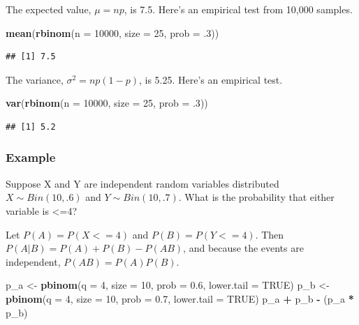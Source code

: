 \documentclass[
]{book}
\newenvironment{Shaded}{\begin{snugshade}}{\end{snugshade}}
\newcommand{\DataTypeTok}[1]{\textcolor[rgb]{0.13,0.29,0.53}{#1}}
\newcommand{\DecValTok}[1]{\textcolor[rgb]{0.00,0.00,0.81}{#1}}
\newcommand{\FloatTok}[1]{\textcolor[rgb]{0.00,0.00,0.81}{#1}}
\newcommand{\KeywordTok}[1]{\textcolor[rgb]{0.13,0.29,0.53}{\textbf{#1}}}
\newcommand{\NormalTok}[1]{#1}
\newcommand{\OperatorTok}[1]{\textcolor[rgb]{0.81,0.36,0.00}{\textbf{#1}}}
\newcommand{\OtherTok}[1]{\textcolor[rgb]{0.56,0.35,0.01}{#1}}
\newcommand{\StringTok}[1]{\textcolor[rgb]{0.31,0.60,0.02}{#1}}
\begin{document}
The expected value, \(\mu = np\), is 7.5. Here's an empirical test from 10,000 samples.

\begin{Shaded}
\begin{Highlighting}[]
\KeywordTok{mean}\NormalTok{(}\KeywordTok{rbinom}\NormalTok{(}\DataTypeTok{n =} \DecValTok{10000}\NormalTok{, }\DataTypeTok{size =} \DecValTok{25}\NormalTok{, }\DataTypeTok{prob =} \FloatTok{.3}\NormalTok{))}
\end{Highlighting}
\end{Shaded}

\begin{verbatim}
## [1] 7.5
\end{verbatim}

The variance, \(\sigma^2 = np (1 - p)\), is 5.25. Here's an empirical test.

\begin{Shaded}
\begin{Highlighting}[]
\KeywordTok{var}\NormalTok{(}\KeywordTok{rbinom}\NormalTok{(}\DataTypeTok{n =} \DecValTok{10000}\NormalTok{, }\DataTypeTok{size =} \DecValTok{25}\NormalTok{, }\DataTypeTok{prob =} \FloatTok{.3}\NormalTok{))}
\end{Highlighting}
\end{Shaded}

\begin{verbatim}
## [1] 5.2
\end{verbatim}

\hypertarget{example-3}{%
\subsubsection*{Example}\label{example-3}}

Suppose X and Y are independent random variables distributed \(X \sim Bin(10, .6)\) and \(Y \sim Bin(10, .7)\). What is the probability that either variable is \textless=4?

Let \(P(A) = P(X<=4)\) and \(P(B) = P(Y<=4)\). Then \(P(A|B) = P(A) + P(B) - P(AB)\), and because the events are independent, \(P(AB) = P(A)P(B)\).

\begin{Shaded}
\begin{Highlighting}[]
\NormalTok{p_a <-}\StringTok{ }\KeywordTok{pbinom}\NormalTok{(}\DataTypeTok{q =} \DecValTok{4}\NormalTok{, }\DataTypeTok{size =} \DecValTok{10}\NormalTok{, }\DataTypeTok{prob =} \FloatTok{0.6}\NormalTok{, }\DataTypeTok{lower.tail =} \OtherTok{TRUE}\NormalTok{)}
\NormalTok{p_b <-}\StringTok{ }\KeywordTok{pbinom}\NormalTok{(}\DataTypeTok{q =} \DecValTok{4}\NormalTok{, }\DataTypeTok{size =} \DecValTok{10}\NormalTok{, }\DataTypeTok{prob =} \FloatTok{0.7}\NormalTok{, }\DataTypeTok{lower.tail =} \OtherTok{TRUE}\NormalTok{)}
\NormalTok{p_a }\OperatorTok{+}\StringTok{ }\NormalTok{p_b }\OperatorTok{-}\StringTok{ }\NormalTok{(p_a }\OperatorTok{*}\StringTok{ }\NormalTok{p_b)}
\end{Highlighting}
\end{Shaded}
\end{document}
